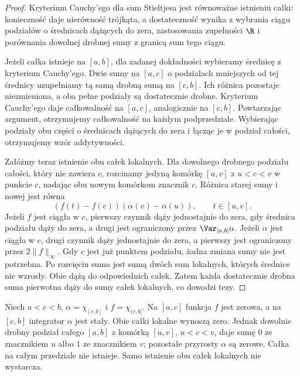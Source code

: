 \begin{proof}
Kryterium Cauchy'ego dla sum Stieltjesa jest równoważne istnieniu całki: konieczność daje nierówność trójkąta, a dostateczność wynika z wybrania ciągu podziałów o średnicach dążących do zera, zastosowania zupełności $\R$ i porównania dowolnej drobnej sumy z granicą sum tego ciągu.

Jeżeli całka istnieje na $[a,b]$, dla zadanej dokładności wybieramy średnicę z kryterium Cauchy'ego. Dwie sumy na $[a,c]$ o podziałach mniejszych od tej średnicy uzupełniamy tą samą drobną sumą na $[c,b]$. Ich różnica pozostaje niezmieniona, a oba pełne podziały są dostatecznie drobne. Kryterium Cauchy'ego daje całkowalność na $[a,c]$, analogicznie na $[c,b]$. Powtarzając argument, otrzymujemy całkowalność na każdym podprzedziale. Wybierając podziały obu części o średnicach dążących do zera i łącząc je w podział całości, otrzymujemy wzór addytywności.

Załóżmy teraz istnienie obu całek lokalnych. Dla dowolnego drobnego podziału całości, który nie zawiera $c$, rozcinamy jedyną komórkę $[u,v]$ z $u<c<v$ w punkcie $c$, nadając obu nowym komórkom znacznik $c$. Różnica starej sumy i nowej jest równa
\[
 (f(t)-f(c))(\alpha(v)-\alpha(u)),
 \qquad t\in[u,v].
\]
Jeżeli $f$ jest ciągła w $c$, pierwszy czynnik dąży jednostajnie do zera, gdy średnica podziału dąży do zera, a drugi jest ograniczony przez $\Var_{[a,b]}\alpha$. Jeżeli $\alpha$ jest ciągła w $c$, drugi czynnik dąży jednostajnie do zera, a pierwszy jest ograniczony przez $2\|f\|_\infty$. Gdy $c$ jest już punktem podziału, żadna zmiana sumy nie jest potrzebna. Po rozcięciu suma jest sumą dwóch sum lokalnych, których średnice nie wzrosły. Obie dążą do odpowiednich całek. Zatem każda dostatecznie drobna suma pierwotna dąży do sumy całek lokalnych, co dowodzi tezy.
\end{proof}
\begin{przyklad}\label{it:ex:rs-gluing-failure}
Niech $a<c<b$, $\alpha=\chi_{[c,b]}$ i $f=\chi_{(c,b]}$. Na $[a,c]$ funkcja $f$ jest zerowa, a na $[c,b]$ integrator $\alpha$ jest stały. Obie całki lokalne wynoszą zero. Jednak dowolnie drobny podział całego $[a,b]$ z komórką $[u,v]$, $u<c<v$, daje sumę $0$ ze znacznikiem $u$ albo $1$ ze znacznikiem $v$; pozostałe przyrosty $\alpha$ są zerowe. Całka na całym przedziale nie istnieje. Samo istnienie obu całek lokalnych nie wystarcza.
\end{przyklad}

